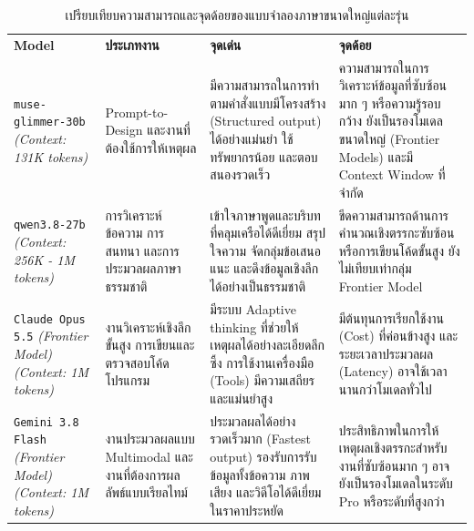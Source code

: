 \begin{table}[H]
  \centering
  \small
  \caption{เปรียบเทียบความสามารถและจุดด้อยของแบบจำลองภาษาขนาดใหญ่แต่ละรุ่น}
  \label{tab:ai-models-comparison}
  \begin{tabularx}{\textwidth}{
      >{\raggedright\arraybackslash}p{}
      |
      >{\raggedright\arraybackslash}X
      >{\raggedright\arraybackslash}X
      >{\raggedright\arraybackslash}X
    }
    \hhline{=|===}
    \textbf{Model} &
    \textbf{ประเภทงาน} &
    \textbf{จุดเด่น} &
    \textbf{จุดด้อย} \\
    \hhline{=|===}
    
    \texttt{muse-glimmer-30b} \newline \textit{(Context: 131K tokens)} &
    Prompt-to-Design และงานที่ต้องใช้การให้เหตุผล &
    มีความสามารถในการทำตามคำสั่งแบบมีโครงสร้าง (Structured output) ได้อย่างแม่นยำ ใช้ทรัพยากรน้อย และตอบสนองรวดเร็ว &
    ความสามารถในการวิเคราะห์ข้อมูลที่ซับซ้อนมาก ๆ หรือความรู้รอบกว้าง ยังเป็นรองโมเดลขนาดใหญ่ (Frontier Models) และมี Context Window ที่จำกัด \\

    \hline
    
    \texttt{qwen3.8-27b} \newline \textit{(Context: 256K - 1M tokens)} &
    การวิเคราะห์ข้อความ การสนทนา และการประมวลผลภาษาธรรมชาติ &
    เข้าใจภาษาพูดและบริบทที่คลุมเครือได้ดีเยี่ยม สรุปใจความ จัดกลุ่มข้อเสนอแนะ และดึงข้อมูลเชิงลึกได้อย่างเป็นธรรมชาติ &
    ขีดความสามารถด้านการคำนวณเชิงตรรกะซับซ้อน หรือการเขียนโค้ดขั้นสูง ยังไม่เทียบเท่ากลุ่ม Frontier Model \\

    \hline

    \texttt{Claude Opus 5.5} \newline \textit{(Frontier Model)} \newline \textit{(Context: 1M tokens)} &
    งานวิเคราะห์เชิงลึกขั้นสูง การเขียนและตรวจสอบโค้ดโปรแกรม &
    มีระบบ Adaptive thinking ที่ช่วยให้เหตุผลได้อย่างละเอียดลึกซึ้ง การใช้งานเครื่องมือ (Tools) มีความเสถียรและแม่นยำสูง &
    มีต้นทุนการเรียกใช้งาน (Cost) ที่ค่อนข้างสูง และระยะเวลาประมวลผล (Latency) อาจใช้เวลานานกว่าโมเดลทั่วไป \\

    \hline
    
    \texttt{Gemini 3.8 Flash} \newline \textit{(Frontier Model)} \newline \textit{(Context: 1M tokens)} &
    งานประมวลผลแบบ Multimodal และงานที่ต้องการผลลัพธ์แบบเรียลไทม์ &
    ประมวลผลได้อย่างรวดเร็วมาก (Fastest output) รองรับการรับข้อมูลทั้งข้อความ ภาพ เสียง และวิดีโอได้ดีเยี่ยมในราคาประหยัด &
    ประสิทธิภาพในการให้เหตุผลเชิงตรรกะสำหรับงานที่ซับซ้อนมาก ๆ อาจยังเป็นรองโมเดลในระดับ Pro หรือระดับที่สูงกว่า \\


\end{tabularx}
\end{table}
